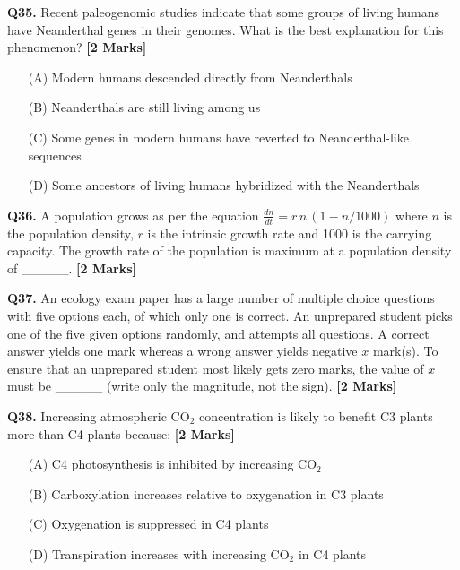 \documentclass[11pt]{article}
\newcommand{\questionb}[2]{
    \noindent\textbf{Q#2.} #1 \hfill \textbf{[2 Marks]}
}
\begin{document}
\questionb{Recent paleogenomic studies indicate that some groups of living humans have Neanderthal genes in their genomes. What is the best explanation for this phenomenon?}{35}
\begin{enumerate}
    \item[(A)] Modern humans descended directly from Neanderthals  
    \item[(B)] Neanderthals are still living among us  
    \item[(C)] Some genes in modern humans have reverted to Neanderthal-like sequences  
    \item[(D)] Some ancestors of living humans hybridized with the Neanderthals  
\end{enumerate}
\vspace{0.5cm}

\questionb{A population grows as per the equation $\frac{dn}{dt} = r \, n \, (1 - n/1000)$ where $n$ is the population density, $r$ is the intrinsic growth rate and 1000 is the carrying capacity. The growth rate of the population is maximum at a population density of \_\_\_\_\_.}{36}
\vspace{0.5cm}

\questionb{An ecology exam paper has a large number of multiple choice questions with five options each, of which only one is correct. An unprepared student picks one of the five given options randomly, and attempts all questions. A correct answer yields one mark whereas a wrong answer yields negative $x$ mark(s). To ensure that an unprepared student most likely gets zero marks, the value of $x$ must be \_\_\_\_\_ (write only the magnitude, not the sign).}{37}
\vspace{0.5cm}

\questionb{Increasing atmospheric CO$_2$ concentration is likely to benefit C3 plants more than C4 plants because:}{38}
\begin{enumerate}
    \item[(A)] C4 photosynthesis is inhibited by increasing CO$_2$  
    \item[(B)] Carboxylation increases relative to oxygenation in C3 plants  
    \item[(C)] Oxygenation is suppressed in C4 plants  
    \item[(D)] Transpiration increases with increasing CO$_2$ in C4 plants  
\end{enumerate}
\vspace{0.5cm}
\end{document}
